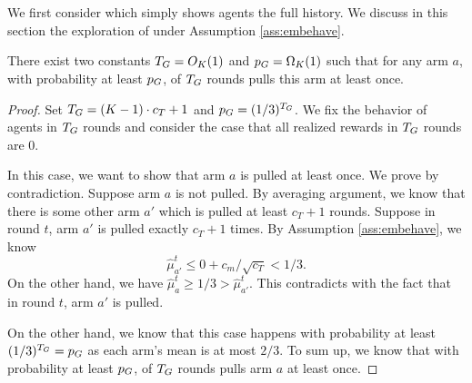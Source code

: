 \section{\ALGG}
We first consider \ALGG which simply shows agents the full history. We discuss in this section the exploration of \ALGG under Assumption \ref{ass:embehave}.

\begin{lemma}
\label{lem:greedy}
There exist two constants $T_G = O_K(1)$ and $p_G = \Omega_K(1)$ such that for any arm $a$, with probability at least $p_G$, \ALGG of $T_G$ rounds pulls this arm at least once. 
\end{lemma}

\begin{proof}
Set $T_G = (K-1) \cdot c_T + 1$ and $p_G = (1/3)^{T_G}$. We fix the behavior of agents in $T_G$ rounds and consider the case that all realized rewards in $T_G$ rounds are 0. 

In this case, we want to show that arm $a$ is pulled at least once. We prove by contradiction. Suppose arm $a$ is not pulled. By averaging argument, we know that there is some other arm $a'$ which is pulled at least $c_T + 1$ rounds. Suppose in round $t$, arm $a'$ is pulled exactly $c_T + 1$ times. By Assumption \ref{ass:embehave}, we know 
\[
\hat{\mu}_{a'}^t \leq 0 + c_m / \sqrt{c_T} < 1/3. 
\]
On the other hand, we have $\hat{\mu}_a^t \geq 1/3 > \hat{\mu}_{a'}^t$. This contradicts with the fact that in round $t$, arm $a'$ is pulled. 

On the other hand, we know that this case happens with probability at least $(1/3)^{T_G} = p_G$ as each arm's mean is at most $2/3$. To sum up, we know that with probability at least $p_G$, \ALGG of $T_G$ rounds pulls arm $a$ at least once. 
\end{proof}